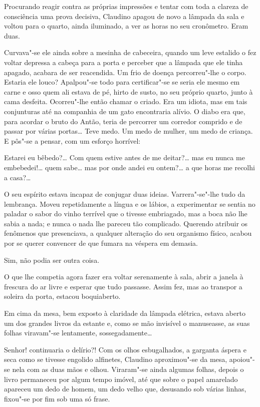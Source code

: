 Procurando reagir contra as próprias impressões e tentar com toda a
clareza de consciência uma prova decisiva, Claudino apagou de novo a
lâmpada da sala e voltou para o quarto, ainda iluminado, a ver as horas
no seu cronômetro. Eram duas.

Curvava"-se ele ainda sobre a mesinha de cabeceira, quando um leve
estalido o fez voltar depressa a cabeça para a porta e perceber que a
lâmpada que ele tinha apagado, acabara de ser reacendida. Um frio de
doença percorreu"-lhe o corpo. Estaria ele louco? Apalpou"-se todo para
certificar"-se se seria ele mesmo em carne e osso quem ali estava de pé,
hirto de susto, no seu próprio quarto, junto à cama desfeita.
Ocorreu"-lhe então chamar o criado. Era um idiota, mas em tais
conjunturas até na companhia de um gato encontraria alívio. O diabo era
que, para acordar o bruto do Antão, teria de percorrer um corredor
comprido e de passar por várias portas\ldots{} Teve medo. Um medo de mulher,
um medo de criança. E pôs"-se a pensar, com um esforço horrível:

Estarei eu bêbedo?\ldots{} Com quem estive antes de me deitar?\ldots{} mas eu
nunca me embebedei!\ldots{} quem sabe\ldots{} mas por onde andei eu ontem?\ldots{} a
que horas me recolhi a casa?\ldots{}

O seu espírito estava incapaz de conjugar duas ideias. Varrera"-se"-lhe
tudo da lembrança. Moveu repetidamente a língua e os lábios, a
experimentar se sentia no paladar o sabor do vinho terrível que o
tivesse embriagado, mas a boca não lhe sabia a nada; e nunca o nada lhe
pareceu tão complicado. Querendo atribuir os fenômenos que presenciava,
a qualquer alteração do seu organismo físico, acabou por se querer
convencer de que fumara na véspera em demasia.

Sim, não podia ser outra coisa.

O que lhe competia agora fazer era voltar serenamente à sala, abrir a
janela à frescura do ar livre e esperar que tudo passasse. Assim fez,
mas ao transpor a soleira da porta, estacou boquiaberto.

Em cima da mesa, bem exposto à claridade da lâmpada elétrica, estava
aberto um dos grandes livros da estante e, como se mão invisível o
manuseasse, as suas folhas viravam"-se lentamente, sossegadamente\ldots{}

Senhor! continuaria o delírio?! Com os olhos esbugalhados, a garganta
áspera e seca como se tivesse engolido alfinetes, Claudino aproximou"-se
da mesa, apoiou"-se nela com as duas mãos e olhou. Viraram"-se ainda
algumas folhas, depois o livro permaneceu
por algum tempo imóvel, até que sobre o papel amarelado apareceu um dedo
de homem, um dedo velho que, desusando sob várias linhas, fixou"-se por
fim sob uma só frase.

